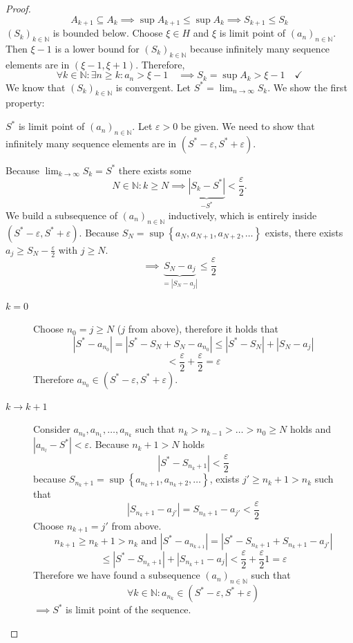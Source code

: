 \documentclass[a4paper,landscape,twocolumn]{article}
\theoremstyle{definition}
\newcommand\set[1]{\left\{#1\right\}}
\newcommand\abs[1]{\left|#1\right|}
\newcommand\seq[1]{{\left(#1\right)}_{n \in \mathbb N}}
\begin{document}
\begin{proof}
  \[ A_{k+1} \subseteq A_k \implies \sup{A_{k+1}} \leq \sup{A_{k}} \implies S_{k+1} \leq S_k \]
  $\left(S_k\right)_{k\in\mathbb N}$ is bounded below. Choose
  $\xi \in H$ and $\xi$ is limit point of $\seq{a_n}$.
  Then $\xi - 1$ is a lower bound for $\left(S_k\right)_{k\in\mathbb N}$ because infinitely many sequence elements
  are in $(\xi - 1, \xi + 1)$.
  Therefore,
  \[
    \forall k \in \mathbb N: \exists n \geq k: a_n > \xi - 1
    \quad\implies S_k = \sup{A_k} > \xi - 1
    \quad\checkmark
  \]
  We know that $\left(S_k\right)_{k\in\mathbb N}$ is convergent. Let $S^* = \lim_{n\to\infty} S_k$.
  We show the first property:

  $S^*$ is limit point of $\left(a_n\right)_{n\in\mathbb N}$.
  Let $\varepsilon > 0$ be given. We need to show that infinitely many sequence elements
  are in $(S^* - \varepsilon, S^* + \varepsilon)$.

  Because $\lim_{k\to\infty} S_k = S^*$ there exists some
  \[ N \in \mathbb N: k \geq N \implies \underbrace{\abs{S_k - S^*}}_{-S^*} < \frac\varepsilon2. \]
  We build a subsequence of $\seq{a_n}$ inductively, which is entirely inside $(S^* - \varepsilon, S^* + \varepsilon)$.
  Because $S_N = \sup\set{a_N, a_{N+1}, a_{N+2}, \dots}$ exists, there exists $a_j \geq S_N - \frac\varepsilon2$ with $j \geq N$.
  \[ \implies \underbrace{S_N - a_j}_{=\abs{S_N - a_j}} \leq \frac\varepsilon2 \]
  \begin{description}
    \item[$k = 0$]
      Choose $n_0 = j \geq N$ ($j$ from above), therefore it holds that
      \[
        \abs{S^* - a_{n_0}} = \abs{S^* - S_N + S_N - a_{n_0}} \leq \abs{S^* - S_N} + \abs{S_N - a_j}
      \] \[
        < \frac\varepsilon2 + \frac\varepsilon2
        = \varepsilon
      \]
      Therefore $a_{n_0} \in (S^* - \varepsilon, S^* + \varepsilon)$.
    \item[$k \to k+1$]
      Consider $a_{n_0}, a_{n_1}, \dots, a_{n_k}$ such that $n_k > n_{k-1} > \dots > n_0 \geq N$ holds
      and $\abs{a_{n_l} - S^*} < \varepsilon$. Because $n_k + 1 > N$ holds
      \[ \abs{S^* - S_{n_k + 1}} < \frac\varepsilon2 \]
      because $S_{n_k + 1} = \sup\set{a_{n_k + 1}, a_{n_k + 2}, \dots}$,
      exists ${j'} \geq n_k + 1 > n_k$ such that
      \[ \abs{S_{n_k + 1} - a_{j'}} = S_{n_k + 1} - a_{j'} < \frac\varepsilon2 \]
      Choose $n_{k+1} = {j'}$ from above.
      \[ n_{k+1} \geq n_k + 1 > n_k \text{ and } \abs{S^* - a_{n_{k+1}}} = \abs{S^* - S_{n_k + 1} + S_{n_k + 1} - a_{j'}} \]
      \[ \leq \abs{S^* - S_{n_k + 1}} + \abs{S_{n_k + 1} - a_{j}} < \frac\varepsilon2 + \frac\varepsilon21 = \varepsilon \]
      Therefore we have found a subsequence $\left(a_n\right)_{n\in\mathbb N}$ such that
      \[ \forall k \in \mathbb N: a_{n_k} \in (S^* - \varepsilon, S^* + \varepsilon) \]
      $\implies S^*$ is limit point of the sequence.


\end{description}
\end{proof}
\end{document}
